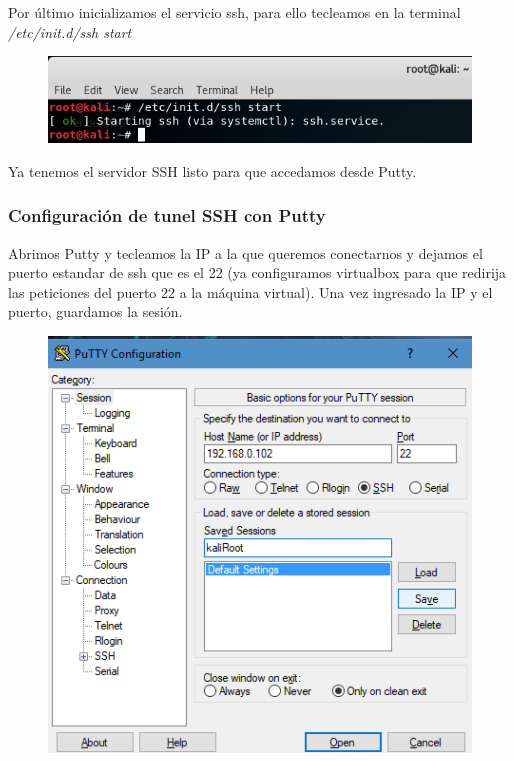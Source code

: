 \documentclass{article}
\begin{document}
Por \'ultimo inicializamos el servicio ssh, para ello tecleamos en la terminal \emph{/etc/init.d/ssh start}

\begin{figure}[H]
\centering
\includegraphics[width=1\textwidth]{07-STARTSSHD}
\end{figure}

Ya tenemos el servidor SSH listo para que accedamos desde Putty.

\subsubsection{Configuraci\'on de tunel SSH con Putty}

Abrimos Putty y tecleamos la IP a la que queremos conectarnos y dejamos el puerto estandar de ssh que es el 22 (ya configuramos virtualbox para que redirija las peticiones del puerto 22 a la m\'aquina virtual). Una vez ingresado la IP y el puerto, guardamos la sesi\'on.

\begin{figure}[H]
\centering
\includegraphics[width=1\textwidth]{08-GUARDARKALIPUTTY}
\end{figure}
\end{document}
